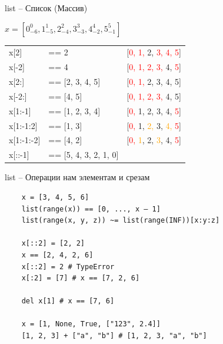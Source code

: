 \documentclass{article}
\begin{document}
\begin{center} list – Список (Массив) \end{center}
{
\Huge
$x = [0_{-6}^{0}, 1_{-5}^{1}, 2_{-4}^{2}, 3_{-3}^{3}, 4_{-2}^{4}, 5_{-1}^{5}]$ \\
\vspace{1cm}
\begin{tabular}{ l l l }
x[2] & == 2 & \hspace{2cm}[\textcolor{red}{0, 1,} 2, \textcolor{red}{3, 4, 5}] \\
x[-2] & == 4 & \hspace{2cm}[\textcolor{red}{0, 1, 2, 3,} 4, \textcolor{red}{5}] \\
x[2:] & == [2, 3, 4, 5] & \hspace{2cm}[\textcolor{red}{0, 1, }2, 3, 4, 5] \\
x[-2:] & == [4, 5] & \hspace{2cm}[\textcolor{red}{0, 1, 2, 3,} 4, 5] \\
x[1:-1] & == [1, 2, 3, 4] & \hspace{2cm}[\textcolor{red}{0,} 1, 2, 3, 4, \textcolor{red}{5}] \\
x[1:-1:2] & == [1, 3] & \hspace{2cm}[\textcolor{red}{0,} 1, \textcolor{orange}{2,} 3, \textcolor{orange}{4,} \textcolor{red}{5}] \\
x[1:-1:-2] & == [4, 2] & \hspace{2cm}[\textcolor{red}{0,} \textcolor{orange}{1}, 2, \textcolor{orange}{3}, 4, \textcolor{red}{5}] \\
x[::-1] & == [5, 4, 3, 2, 1, 0] & \\
\end{tabular}
}
\newpage

\begin{center} list – Операции нам элементам и срезам \end{center}
\vspace{15pt}
\begin{lstlisting}
	x = [3, 4, 5, 6]
	list(range(x)) == [0, ..., x – 1]
	list(range(x, y, z)) ~= list(range(INF))[x:y:z]

	x[::2] = [2, 2]  
	x == [2, 4, 2, 6]
	x[::2] = 2 # TypeError
	x[:2] = [7] # x == [7, 2, 6]
	
	del x[1] # x == [7, 6]
	
	x = [1, None, True, ["123", 2.4]]
	[1, 2, 3] + ["a", "b"] # [1, 2, 3, "a", "b"]
\end{lstlisting}
\newpage
\end{document}
